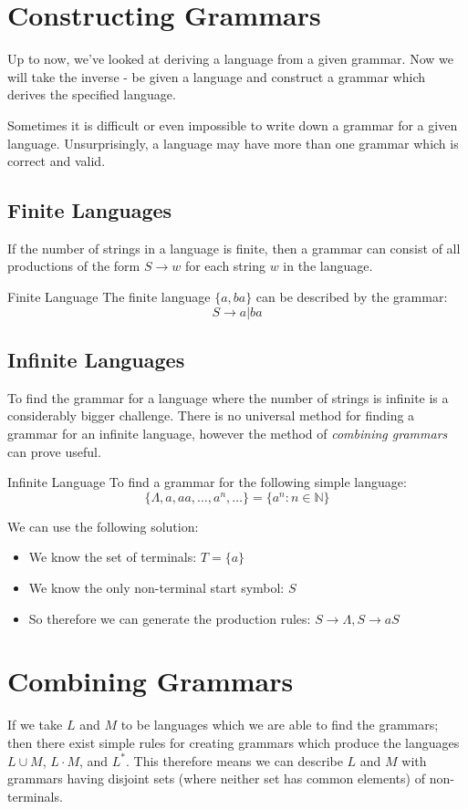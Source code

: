 \section{Constructing Grammars}
Up to now, we've looked at deriving a language from a given grammar. Now we will take the inverse - be given a language and construct a grammar which derives the specified language.

Sometimes it is difficult or even impossible to write down a grammar for a given language. Unsurprisingly, a language may have more than one grammar which is correct and valid.

\subsection{Finite Languages}
If the number of strings in a language is finite, then a grammar can consist of all productions of the form $S \rightarrow w$ for each string $w$ in the language. 

\begin{example}{Finite Language}
The finite language $\{a, ba\}$ can be described by the grammar:
\[S \rightarrow a|ba\]
\end{example}

\subsection{Infinite Languages}
To find the grammar for a language where the number of strings is infinite is a considerably bigger challenge. There is no universal method for finding a grammar for an infinite language, however the method of \textit{combining grammars} can prove useful. 

\begin{example}{Infinite Language}
To find a grammar for the following simple language:
\[\{\Lambda, a, aa, \ldots, a^n, \ldots\} = \{a^n : n \in \mathbb{N}\}\]

We can use the following solution:
\begin{itemize}
    \item We know the set of terminals: $T = \{a\}$
    \item We know the only non-terminal start symbol: $S$
    \item So therefore we can generate the production rules: $S \rightarrow \Lambda, S \rightarrow aS$
\end{itemize}
\end{example}

\section{Combining Grammars}
If we take $L$ and $M$ to be languages which we are able to find the grammars; then there exist simple rules for creating grammars which produce the languages $L \cup M$, $L \cdot M$, and $L^*$. This therefore means we can describe $L$ and $M$ with grammars having disjoint sets (where neither set has common elements) of non-terminals. 


